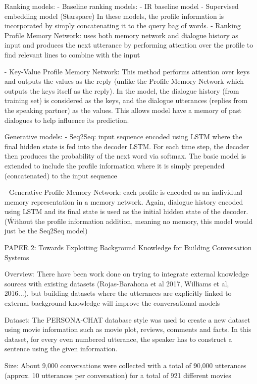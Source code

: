 Ranking models:
	- Baseline ranking models: - IR baseline model
							   - Supervised embedding model (Starspace)
		In these models, the profile information is incorporated by simply concatenating it to the query bag of words.
	- Ranking Profile Memory Network: uses both memory network and dialogue history as input and produces the next utterance by performing attention over the profile to find relevant lines to combine with the input
	
	- Key-Value Profile Memory Network: This method performs attention over keys and outputs the values as the reply (unlike the Profile Memory Network which outputs the keys itself as the reply). In the model, the dialogue history (from training set) is considered as the keys, and the dialogue utterances (replies from the speaking partner) as the values. This allows model have a memory of past dialogues to help influence its prediction.

Generative models:
	- Seq2Seq: input sequence encoded using LSTM where the final hidden state is fed into the decoder LSTM. For each time step, the decoder then produces the probability of the next word via softmax. The basic model is extended to include the profile information where it is simply prepended (concatenated) to the input sequence
	
	- Generative Profile Memory Network: each profile is encoded as an individual memory representation in a memory network. Again, dialogue history encoded using LSTM and its final state is used as the initial hidden state of the decoder. (Ẃithout the profile information addition, meaning no memory, this model would just be the Seq2Seq model)



PAPER 2:
Towards Exploiting Background Knowledge for Building Conversation Systems

Overview:
There have been work done on trying to integrate external knowledge sources with existing datasets (Rojas-Barahona et al 2017, Williams et al, 2016...), but building datasets where the utterances are explicitly linked to external background knowledge will improve the conversational models

Dataset:
The PERSONA-CHAT database style was used to create a new dataset using movie information such as movie plot, reviews, comments and facts. In this dataset, for every even numbered utterance, the speaker has to construct a sentence using the given information.

Size: About 9,000 conversations were collected with a total of 90,000 utterances (approx. 10 utterances per conversation) for a total of 921 different movies

